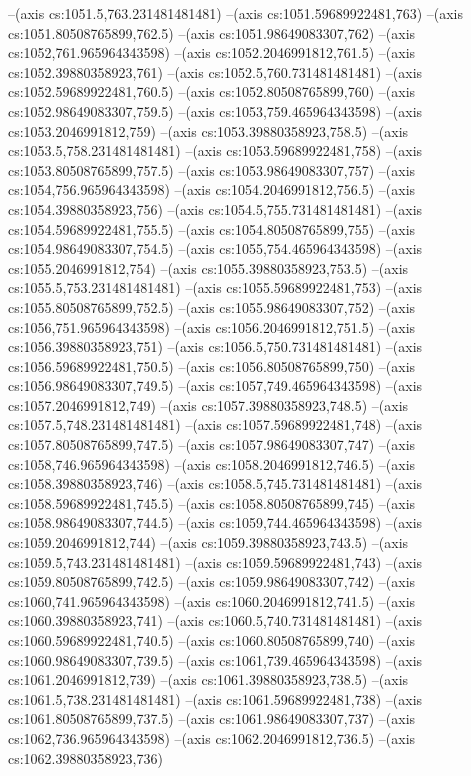 --(axis cs:1051.5,763.231481481481)
--(axis cs:1051.59689922481,763)
--(axis cs:1051.80508765899,762.5)
--(axis cs:1051.98649083307,762)
--(axis cs:1052,761.965964343598)
--(axis cs:1052.2046991812,761.5)
--(axis cs:1052.39880358923,761)
--(axis cs:1052.5,760.731481481481)
--(axis cs:1052.59689922481,760.5)
--(axis cs:1052.80508765899,760)
--(axis cs:1052.98649083307,759.5)
--(axis cs:1053,759.465964343598)
--(axis cs:1053.2046991812,759)
--(axis cs:1053.39880358923,758.5)
--(axis cs:1053.5,758.231481481481)
--(axis cs:1053.59689922481,758)
--(axis cs:1053.80508765899,757.5)
--(axis cs:1053.98649083307,757)
--(axis cs:1054,756.965964343598)
--(axis cs:1054.2046991812,756.5)
--(axis cs:1054.39880358923,756)
--(axis cs:1054.5,755.731481481481)
--(axis cs:1054.59689922481,755.5)
--(axis cs:1054.80508765899,755)
--(axis cs:1054.98649083307,754.5)
--(axis cs:1055,754.465964343598)
--(axis cs:1055.2046991812,754)
--(axis cs:1055.39880358923,753.5)
--(axis cs:1055.5,753.231481481481)
--(axis cs:1055.59689922481,753)
--(axis cs:1055.80508765899,752.5)
--(axis cs:1055.98649083307,752)
--(axis cs:1056,751.965964343598)
--(axis cs:1056.2046991812,751.5)
--(axis cs:1056.39880358923,751)
--(axis cs:1056.5,750.731481481481)
--(axis cs:1056.59689922481,750.5)
--(axis cs:1056.80508765899,750)
--(axis cs:1056.98649083307,749.5)
--(axis cs:1057,749.465964343598)
--(axis cs:1057.2046991812,749)
--(axis cs:1057.39880358923,748.5)
--(axis cs:1057.5,748.231481481481)
--(axis cs:1057.59689922481,748)
--(axis cs:1057.80508765899,747.5)
--(axis cs:1057.98649083307,747)
--(axis cs:1058,746.965964343598)
--(axis cs:1058.2046991812,746.5)
--(axis cs:1058.39880358923,746)
--(axis cs:1058.5,745.731481481481)
--(axis cs:1058.59689922481,745.5)
--(axis cs:1058.80508765899,745)
--(axis cs:1058.98649083307,744.5)
--(axis cs:1059,744.465964343598)
--(axis cs:1059.2046991812,744)
--(axis cs:1059.39880358923,743.5)
--(axis cs:1059.5,743.231481481481)
--(axis cs:1059.59689922481,743)
--(axis cs:1059.80508765899,742.5)
--(axis cs:1059.98649083307,742)
--(axis cs:1060,741.965964343598)
--(axis cs:1060.2046991812,741.5)
--(axis cs:1060.39880358923,741)
--(axis cs:1060.5,740.731481481481)
--(axis cs:1060.59689922481,740.5)
--(axis cs:1060.80508765899,740)
--(axis cs:1060.98649083307,739.5)
--(axis cs:1061,739.465964343598)
--(axis cs:1061.2046991812,739)
--(axis cs:1061.39880358923,738.5)
--(axis cs:1061.5,738.231481481481)
--(axis cs:1061.59689922481,738)
--(axis cs:1061.80508765899,737.5)
--(axis cs:1061.98649083307,737)
--(axis cs:1062,736.965964343598)
--(axis cs:1062.2046991812,736.5)
--(axis cs:1062.39880358923,736)
